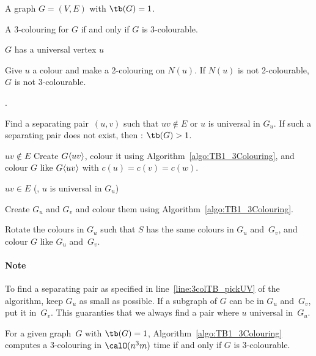\begin{algorithm}
    [htb]
    \caption
    {%
        Computes a 3-colouring problem for a given graph~$G$ with $\tb(G) = 1$.
    }
    \label{algo:TB1_3Colouring}

\KwIn
{%
    A graph $G = (V, E)$ with $\tb(G) = 1$.
}

\KwOut
{%
    A 3-colouring for $G$ if and only if $G$ is 3-colourable.
}

\If
{%
    $G$ has a universal vertex $u$
}
{%
    Give $u$ a colour and make a 2-colouring on $N(u)$.
    If $N(u)$ is not 2-colourable, $G$ is not 3-colourable.
    \label{line:3colUnivVert}

    .
}

Find a separating pair~$(u, v)$ such that $uv \notin E$ or $u$ is universal in $G_u$.
If such a separating pair does not exist, then : $\tb(G) > 1$.
\label{line:3colTB_pickUV}

\If
{%
    $uv \notin E$
}
{%
    Create $G \langle uv \rangle$, colour it using Algorithm~\ref{algo:TB1_3Colouring}, and colour $G$ like $G \langle uv \rangle$ with $c(u) = c(v) = c(w)$.
    \label{line:3ColGPrime}
}

\If
{%
    $uv \in E$  (\ie, $u$ is universal in $G_u$)
}
{%
    Create $G_u$ and $G_v$ and colour them using Algorithm~\ref{algo:TB1_3Colouring}.
    \label{line:3ColGuGv}

    Rotate the colours in $G_u$ such that $S$ has the same colours in $G_u$ and~$G_v$, and colour $G$ like $G_u$ and~$G_v$.
    \label{line:3ColGuGvToG}
}

\end{algorithm}

\paragraph{Note}
To find a separating pair as specified in line~\ref{line:3colTB_pickUV} of the algorithm, keep $G_u$ as small as possible.
If a subgraph of $G$ can be in $G_u$ and~$G_v$, put it in~$G_v$.
This guaranties that we always find a pair where $u$ universal in~$G_u$.

\begin{theorem}
For a given graph~\( G \) with \( \tb(G) = \nobreak 1 \), Algorithm~\ref{algo:TB1_3Colouring} computes a 3-colouring in \( \calO(n^3m) \) time if and only if \( G \) is 3-colourable.
\end{theorem}

